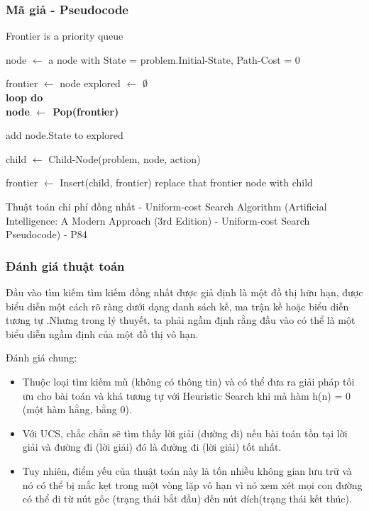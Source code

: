 \documentclass{article}
\newcommand{\LoopDo}{\bf loop do}
\let\oldemptyset\emptyset
\let\emptyset\varnothing
\begin{document}
\subsubsection{Mã giả - Pseudocode}
\begin{algorithm}[H]
\DontPrintSemicolon
  
Frontier is a priority queue \\

node $\leftarrow$ a node with State = problem.Initial-State, Path-Cost = 0

frontier $\leftarrow$ node 
explored $\leftarrow$ $\oldemptyset$\\
\LoopDo \\
\If{frontier = $\oldemptyset$}
{
}
node $\leftarrow$ Pop(frontier)  \\
{
}

add node.State to explored \\
{
    child $\leftarrow$ Child-Node(problem, node, action)
    
    {
        frontier $\leftarrow$  Insert(child, frontier)
    }
    {
        replace that frontier node with child
    }
}
\EndFunction

\caption{Thuật toán chi phí đồng nhất - Uniform-cost Search Algorithm (Artificial Intelligence: A Modern Approach (3rd Edition) - Uniform-cost Search Pseudocode) - P84}
\end{algorithm}


\subsubsection{Đánh giá thuật toán}
Đầu vào tìm kiếm tìm kiếm đồng nhất được giả định là một đồ thị hữu hạn, được biểu diễn một cách rõ ràng dưới dạng danh sách kề, ma trận kề hoặc biểu diễn tương tự .Nhưng trong lý thuyết, ta phải ngầm định rằng đầu vào có thể là một biểu diễn ngầm định của một đồ thị vô hạn.

Đánh giá chung:
\begin{itemize}
\item Thuộc loại tìm kiếm mù (không có thông tin) và có thể đưa ra giải pháp tối ưu cho bài toán và khá tương tự với Heuristic Search khi mà hàm h(n) = 0 (một hàm hằng, bằng 0).
\item Với UCS, chắc chắn sẽ tìm thấy lời giải (đường đi) nếu bài toán tồn tại lời giải và đường đi (lời giải) đó là đường đi (lời giải) tốt nhất.
\item Tuy nhiên, điểm yếu của thuật toán này là tốn nhiều không gian lưu trữ và nó có thể bị mắc kẹt trong một vòng lặp vô hạn vì nó xem xét mọi con đường có thể đi từ nút gốc (trạng thái bắt đầu) đến nút đích(trạng thái kết thúc).
\end{itemize}
\end{document}
